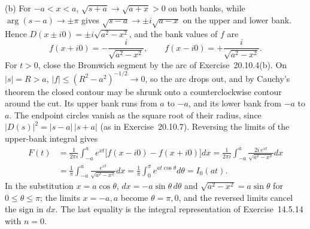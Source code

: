 (b) For $-a<x<a$, $\sqrt{s+a}\to\sqrt{a+x}>0$ on both banks,
while $\arg(s-a)\to\pm\pi$ gives $\sqrt{s-a}\to\pm i\sqrt{a-x}$
on the upper and lower bank. Hence
$D(x\pm i0)=\pm i\sqrt{a^2-x^2}$, and the bank values of $f$
are
\[
f(x+i0)=-\frac i{\sqrt{a^2-x^2}},\qquad
f(x-i0)=+\frac i{\sqrt{a^2-x^2}}.
\]
For $t>0$, close the Bromwich segment by the arc of
Exercise~20.10.4(b). On $|s|=R>a$,
$|f|\le(R^2-a^2)^{-1/2}\to0$, so the arc drops out, and by
Cauchy's theorem the closed contour may be shrunk onto a
counterclockwise contour around the cut. Its upper bank runs
from $a$ to $-a$, and its lower bank from $-a$ to $a$. The
endpoint circles vanish as the square root of their radius,
since $|D(s)|^2=|s-a|\,|s+a|$ (as in Exercise~20.10.7).
Reversing the limits of the upper-bank integral gives
\begin{align*}
F(t)&=\frac1{2\pi i}\int_{-a}^a e^{xt}
\big[f(x-i0)-f(x+i0)\big]dx
=\frac1{2\pi i}\int_{-a}^a\frac{2i\,e^{xt}}{\sqrt{a^2-x^2}}dx\\
&=\frac1\pi\int_{-a}^a\frac{e^{xt}}{\sqrt{a^2-x^2}}dx
=\frac1\pi\int_0^\pi e^{at\cos\theta}d\theta
=I_0(at).
\end{align*}
In the substitution $x=a\cos\theta$,
$dx=-a\sin\theta\,d\theta$ and $\sqrt{a^2-x^2}=a\sin\theta$
for $0\le\theta\le\pi$; the limits $x=-a,a$ become
$\theta=\pi,0$, and the reversed limits cancel the sign in
$dx$. The last equality is the integral representation of
Exercise~14.5.14 with $n=0$.

